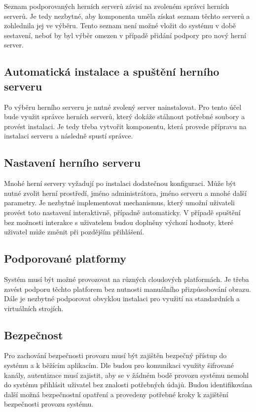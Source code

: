 Seznam podporovaných herních serverů závisí na zvoleném správci herních serverů. Je tedy nezbytné, aby komponenta uměla získat seznam těchto serverů
a zohlednila jej ve výběru. Tento seznam není možné vložit do systému v době sestavení, neboť by byl výběr omezen v případě
přidání podpory pro nový herní server.

\subsection{Automatická instalace a spuštění herního serveru}

Po výběru herního serveru je nutné zvolený server nainstalovat. Pro tento účel bude využit správce herních serverů, který dokáže stáhnout potřebné soubory
a provést instalaci. Je tedy třeba vytvořit komponentu, která provede přípravu na instalaci serveru a následně spustí správce.

\subsection{Nastavení herního serveru}

Mnohé herní servery vyžadují po instalaci dodatečnou konfiguraci. Může být nutné zvolit herní prostředí, jméno administrátora, jméno serveru a mnohé další parametry.
Je nezbytné implementovat mechanismus, který umožní uživateli provést toto nastavení interaktivně, případně automaticky.
V případě spuštění bez možnosti interakce s uživatelem budou doplněny výchozí hodnoty, které uživatel může změnit při pozdějším přihlášení.

\subsection{Podporované platformy}

Systém musí být možné provozovat na různých cloudových platformách. Je třeba zavést podporu těchto platforem bez nutnosti manuálního přizpůsobování obrazu.
Dále je nezbytné podporovat obvyklou instalaci pro využití na standardních a virtuálních strojích.

\subsection{Bezpečnost}

Pro zachování bezpečnosti provozu musí být zajištěn bezpečný přístup do systému a k běžícím aplikacím. Dle \cite{securing_cloud} budou
pro komunikaci využity šifrované kanály, autentizace musí zajistit, aby se v žádném bodě provozu systému nemohl do systému přihlásit uživatel bez znalosti potřebných údajů.
Budou identifikována další možná bezpečnostní opatření a provedeny potřebné kroky k zajištění bezpečnosti provozu systému.

